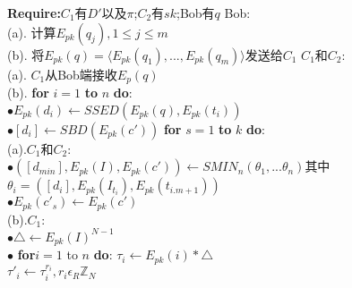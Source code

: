 \begin{algorithm}[H]
\small
\caption{$PPKNNONED(D',q) \rightarrow c_q$}
\label{alg:algorithm4}
\begin{algorithmic}[1]
   \State \textbf{Require:}$C_1$有$D'$以及$\pi$;$C_2$有$sk$;Bob有$q$
   \State Bob:\\
   (a).\hspace{0.1cm} 计算$E_{pk}(q_j),1 \leq j \leq m$\\
   (b).\hspace{0.1cm} 将$E_{pk}(q)=\langle E_{pk}(q_1),...,E_{pk}(q_m)\rangle$发送给$C_1$
   \State $C_1$和$C_2$:\\
   (a).\hspace{0.1cm} $C_1$从Bob端接收$E_{p}(q)$\\
   (b).\hspace{0.1cm} \textbf{for} $i=1$ \textbf{to} $n$ \textbf{do}:\\
   \hspace{1cm}$\bullet E_{pk}(d_i)\leftarrow SSED(E_{pk}(q),E_{pk}(t_i))$\\
   \hspace{0.9cm} $\bullet [d_i] \leftarrow SBD(E_{pk}(c'))$
   \State \textbf{for} $s=1$ \textbf{to} $k$ \textbf{do}:\\
    \hspace{0.6cm}(a).\hspace{0.1cm}$C_1$和$C_2$:\\
    \hspace{1cm} $\bullet ([d_{min}],E_{pk}(I),E_{pk}(c'))\leftarrow SMIN_n(\theta_1,...\theta_n)$其中\\
    \hspace{1.5cm} $\theta_i=([d_i],E_{pk}(I_{t_i}),E_{pk}(t_{i.m+1}))$\\
    \hspace{1cm} $ \bullet E_{pk}(c'_s) \leftarrow E_{pk}(c')$\\
    \hspace{0.6cm}(b).\hspace{0.1cm}$C_1:$\\
    \hspace{1cm} $\bullet \bigtriangleup \leftarrow E_{pk}(I)^{N-1}$\\
    \hspace{1cm} $\bullet$ \textbf{for}$i=1$ to $n$ \textbf{do}:
    \hspace{1.5cm} $\tau_i \leftarrow E_{pk}(i)*\bigtriangleup$\\
    \hspace{1.5cm} $\tau'_i \leftarrow \tau^{r_i}_i,r_i \epsilon_R \mathbb{Z}_N$\\

\end{algorithmic}
\end{algorithm}
